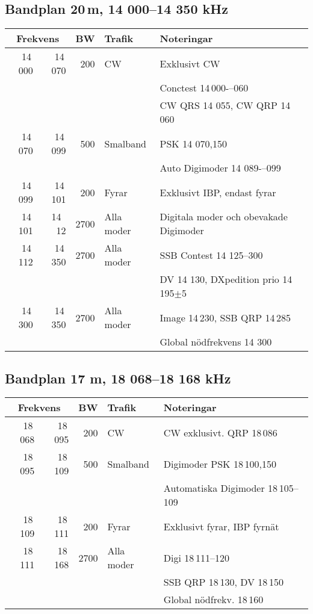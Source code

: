 \subsection{Bandplan 20\,m, 14 000--14 350 kHz}
\begin{tabular}{rrrll}
\multicolumn{2}{c}{\textbf{Frekvens}} & \textbf{BW} & \textbf{Trafik} & \textbf{Noteringar} \\ \hline
14\,000 & 14\,070 & 200  & CW         & Exklusivt CW                             \\
        &         &      &            & Conctest 14\,000-–060                    \\
        &         &      &            & CW QRS 14 055, CW QRP 14\,060            \\ \hline
14\,070 & 14\,099 & 500  & Smalband   & PSK 14 070,150                           \\
        &         &      &            & Auto Digimoder 14 089-–099               \\ \hline
14\,099 & 14\,101 & 200  & Fyrar      & Exklusivt IBP, endast fyrar              \\ \hline
14\,101 & 14 \,12 & 2700 & Alla moder & Digitala moder och obevakade Digimoder   \\ \hline
14\,112 & 14\,350 & 2700 & Alla moder & SSB Contest 14 125--300                  \\
        &         &      &            & DV 14 130, DXpedition prio 14\,195$\pm$5 \\ \hline
14\,300 & 14\,350 & 2700 & Alla moder & Image 14\,230, SSB QRP 14\,285           \\
        &         &      &            & Global nödfrekvens 14 300                \\ \hline
\end{tabular}

\subsection{Bandplan 17 m, 18 068--18 168 kHz}
\begin{tabular}{rrrll}
\multicolumn{2}{c}{\textbf{Frekvens}} & \textbf{BW} & \textbf{Trafik} & \textbf{Noteringar} \\ \hline

18\,068 & 18\,095 & 200  & CW         & CW exklusivt. QRP 18\,086             \\ \hline
18\,095 & 18\,109 & 500  & Smalband   & Digimoder PSK 18\,100,150             \\
        &         &      &            & Automatiska Digimoder 18\,105--109 \\ \hline
18\,109 & 18\,111 & 200  & Fyrar      & Exklusivt fyrar, IBP fyrnät           \\ \hline
18\,111 & 18\,168 & 2700 & Alla moder & Digi 18\,111--120                   \\
        &         &      &            & SSB QRP 18\,130, DV 18\,150           \\
        &         &      &            & Global nödfrekv. 18\,160              \\ \hline
\end{tabular}

